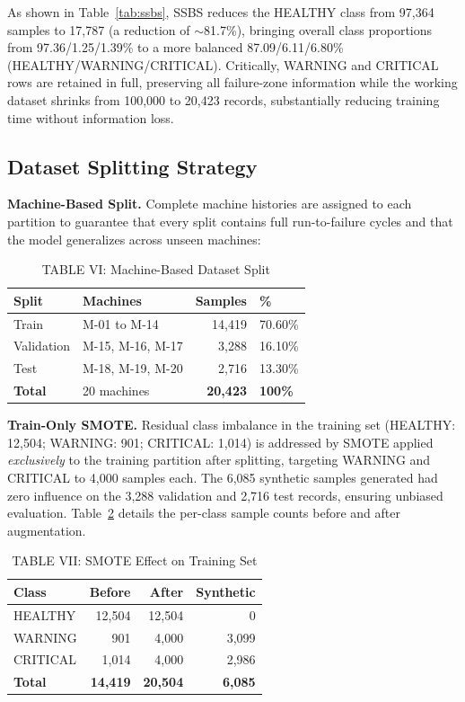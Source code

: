 \documentclass[conference]{IEEEtran}
\begin{document}
As shown in Table~\ref{tab:ssbs}, SSBS reduces the HEALTHY class from 97,364 samples to 17,787 (a reduction of $\sim$81.7\%), bringing overall class proportions from 97.36/1.25/1.39\% to a more balanced 87.09/6.11/6.80\% (HEALTHY/WARNING/CRITICAL). Critically, WARNING and CRITICAL rows are retained in full, preserving all failure-zone information while the working dataset shrinks from 100,000 to 20,423 records, substantially reducing training time without information loss.


\subsection{Dataset Splitting Strategy}
\textbf{Machine-Based Split.} Complete machine histories are assigned to
each partition to guarantee that every split contains full run-to-failure
cycles and that the model generalizes across unseen machines:

\begin{table}[htbp]
\caption{TABLE VI: Machine-Based Dataset Split}
\centering
\begin{tabular}{llrl}
\hline
\textbf{Split} & \textbf{Machines} & \textbf{Samples} & \textbf{\%} \\
\hline
Train      & M-01 to M-14      & 14,419 & 70.60\% \\
Validation & M-15, M-16, M-17  &  3,288 & 16.10\% \\
Test       & M-18, M-19, M-20  &  2,716 & 13.30\% \\
\hline
\textbf{Total} & 20 machines & \textbf{20,423} & \textbf{100\%} \\
\hline
\end{tabular}
\label{tab:split}
\end{table}

\textbf{Train-Only SMOTE.} Residual class imbalance in the training set
(HEALTHY: 12,504; WARNING: 901; CRITICAL: 1,014) is addressed by SMOTE
\cite{chawla2002smote} applied \textit{exclusively} to the training partition
after splitting, targeting WARNING and CRITICAL to 4,000 samples each. The
6,085 synthetic samples generated had zero influence on the 3,288 validation
and 2,716 test records, ensuring unbiased evaluation. Table~\ref{tab:smote}
details the per-class sample counts before and after augmentation.

\begin{table}[htbp]
\caption{TABLE VII: SMOTE Effect on Training Set}
\centering
\begin{tabular}{lrrr}
\hline
\textbf{Class} & \textbf{Before} & \textbf{After} & \textbf{Synthetic} \\
\hline
HEALTHY  & 12,504 & 12,504 &     0 \\
WARNING  &    901 &  4,000 & 3,099 \\
CRITICAL &  1,014 &  4,000 & 2,986 \\
\hline
\textbf{Total} & \textbf{14,419} & \textbf{20,504} & \textbf{6,085} \\
\hline
\end{tabular}
\label{tab:smote}
\end{table}
\end{document}
